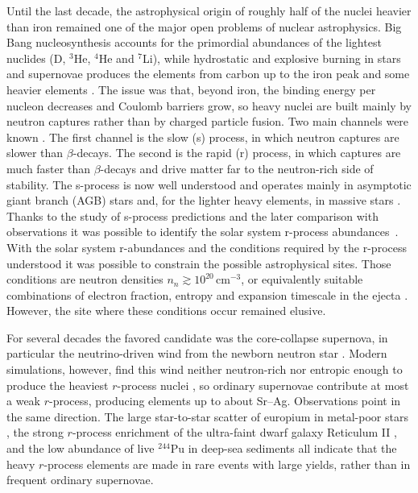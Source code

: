 Until the last decade, the astrophysical origin of roughly half of the nuclei heavier than iron remained one of the major open problems of nuclear astrophysics.
Big Bang nucleosynthesis accounts for the primordial abundances of the lightest nuclides (D, $^{3}$He, $^{4}$He and $^{7}$Li), while hydrostatic and explosive burning in stars and supernovae produces the elements from carbon up to the iron peak and some heavier elements \cite{cyburt_big_2016,thielemann_nucleosynthesis_2018}.
The issue was that, beyond iron, the binding energy per nucleon decreases and Coulomb barriers grow, so heavy nuclei are built mainly by neutron captures rather than by charged particle fusion.
Two main channels were known \cite{burbidge_synthesis_1957}.
The first channel is the slow (s) process, in which neutron captures are slower than $\beta$-decays.
The second is the rapid (r) process, in which captures are much faster than $\beta$-decays and drive matter far to the neutron-rich side of stability.
The s-process is now well understood and operates mainly in asymptotic giant branch (AGB) stars and, for the lighter heavy elements, in massive stars \cite{kappeler_s_2011}.
Thanks to the study of s-process predictions and the later comparison with observations it was possible to identify the solar system r-process abundances~\cite{thielemann_r-process_2026}.
With the solar system r-abundances and the conditions required by the r-process understood it was possible to constrain the possible astrophysical sites.
Those conditions are neutron densities $n_n \gtrsim 10^{20}\,\mathrm{cm^{-3}}$, or equivalently suitable combinations of electron fraction, entropy and expansion timescale in the ejecta \cite{hoffman_model_1997}.
However, the site where these conditions occur remained elusive.

For several decades the favored candidate was the core-collapse supernova, in particular the neutrino-driven wind from the newborn neutron star \cite{woosley_r-process_1994}.
Modern simulations, however, find this wind neither neutron-rich nor entropic enough to produce the heaviest $r$-process nuclei \cite{arcones_nucleosynthesis_2007}, so ordinary supernovae contribute at most a weak $r$-process, producing elements up to about Sr--Ag.
Observations point in the same direction.
The large star-to-star scatter of europium in metal-poor stars \cite{sneden_neutron_2008}, the strong $r$-process enrichment of the ultra-faint dwarf galaxy Reticulum II \cite{ji_complete_2016}, and the low abundance of live $^{244}$Pu in deep-sea sediments \cite{wallner_abundance_2015} all indicate that the heavy $r$-process elements are made in rare events with large yields, rather than in frequent ordinary supernovae.


